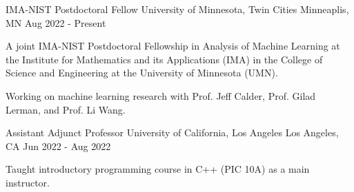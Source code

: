 

\begin{cventries}

  \cventry
    {IMA-NIST Postdoctoral Fellow} %
    {University of Minnesota, Twin Cities} %
    {Minneaplis, MN} %
    {Aug 2022 - Present} %
    {
      \begin{cvitems} %
        \item {A joint IMA-NIST Postdoctoral Fellowship in Analysis of Machine Learning at the Institute for Mathematics and its Applications (IMA) in the College of Science and Engineering at the University of Minnesota (UMN).}
        \item {Working on machine learning research with Prof. Jeff Calder, Prof. Gilad Lerman, and Prof. Li Wang.}
      \end{cvitems}
    }

  \cventry
    {Assistant Adjunct Professor} %
    {University of California, Los Angeles} %
    {Los Angeles, CA} %
    {Jun 2022 - Aug 2022} %
    {
      \begin{cvitems} %
        \item {Taught introductory programming course in C++ (PIC 10A) as a main instructor.}
      \end{cvitems}
    }

\end{cventries}
